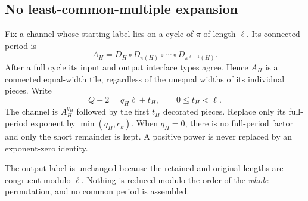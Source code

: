 \documentclass[11pt]{article}
\theoremstyle{remark}\newtheorem{remark}[theorem]{Remark}
\begin{document}
\subsection{No least-common-multiple expansion}
Fix a channel whose starting label lies on a cycle of $\pi$ of length $\ell$. Its connected period is
\[
 A_H=D_H\circ D_{\pi(H)}\circ\cdots\circ D_{\pi^{\ell-1}(H)}.
\]
After a full cycle its input and output interface types agree. Hence $A_H$ is a connected equal-width tile, regardless of the unequal widths of its individual pieces. Write
\begin{equation}\label{eq:individual-period}
 Q-2=q_H\ell+t_H,\qquad 0\le t_H<\ell.
\end{equation}
The channel is $A_H^{q_H}$ followed by the first $t_H$ decorated pieces. Replace only its full-period exponent by $\min(q_H,c_k)$. When $q_H=0$, there is no full-period factor and only the short remainder is kept. A positive power is never replaced by an exponent-zero identity.

The output label is unchanged because the retained and original lengths are congruent modulo $\ell$. Nothing is reduced modulo the order of the \emph{whole} permutation, and no common period is assembled.
\end{document}

